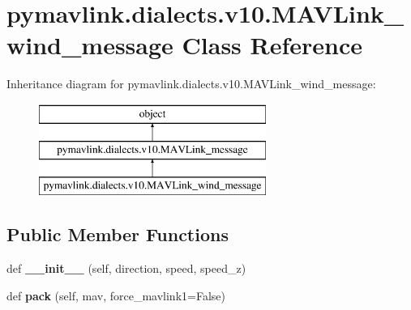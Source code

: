 \hypertarget{classpymavlink_1_1dialects_1_1v10_1_1MAVLink__wind__message}{}\section{pymavlink.\+dialects.\+v10.\+M\+A\+V\+Link\+\_\+wind\+\_\+message Class Reference}
\label{classpymavlink_1_1dialects_1_1v10_1_1MAVLink__wind__message}
Inheritance diagram for pymavlink.\+dialects.\+v10.\+M\+A\+V\+Link\+\_\+wind\+\_\+message\+:\begin{figure}[H]
\begin{center}
\leavevmode
\includegraphics[height=3.000000cm]{classpymavlink_1_1dialects_1_1v10_1_1MAVLink__wind__message}
\end{center}
\end{figure}
\subsection*{Public Member Functions}
\begin{DoxyCompactItemize}
\item 
\mbox{\label{classpymavlink_1_1dialects_1_1v10_1_1MAVLink__wind__message_a50595ad5329991c623b51b0fb0cfb19b}} 
def {\bfseries \+\_\+\+\_\+init\+\_\+\+\_\+} (self, direction, speed, speed\+\_\+z)
\item 
\mbox{\label{classpymavlink_1_1dialects_1_1v10_1_1MAVLink__wind__message_ad13092ac592c9fd8b08b01ccbc0f1efb}} 
def {\bfseries pack} (self, mav, force\+\_\+mavlink1=False)
\end{DoxyCompactItemize}
